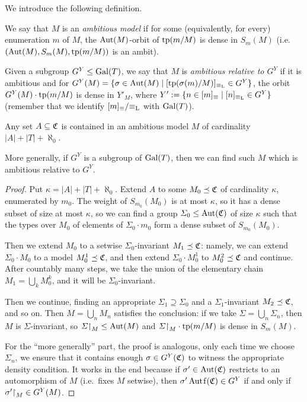 	We introduce the following definition.
	\begin{dfn}
		\label{dfn:ambitious_model}
		We say that $M$ is an \emph{ambitious model} if for some (equivalently, for every) enumeration $m$ of $M$, the $\operatorname{{Aut}}(M)$-orbit of $\operatorname{{tp}}(m/M)$ is dense in $S_m(M)$ (i.e.\ $(\operatorname{{Aut}}(M),S_m(M),\operatorname{{tp}}(m/M))$ is an ambit).
		
		Given a subgroup $G^Y\leq \operatorname{{Gal}}(T)$, we say that $M$ is \emph{ambitious relative to $G^Y$} if it is ambitious and for $G^Y(M)=\{\sigma\in \operatorname{{Aut}}(M) \mid [\operatorname{{tp}}(\sigma(m)/M)]_{\equiv_{\mathrm{L}}}\in G^Y \}$, the orbit $G^Y(M)\cdot \operatorname{{tp}}(m/M)$ is dense in $Y'_M$, where $Y':=\{n\in [m]_{\equiv}\mid [n]_{\equiv_{\mathrm{L}}}\in G^Y \}$ (remember that we identify $[m]_\equiv/{\equiv_{\mathrm{L}}}$ with $\operatorname{{Gal}}(T)$).
		\xqed{\lozenge}
	\end{dfn}
	
	\begin{prop}
		\label{prop:amb_exist}
		Any set $A\subseteq {\mathfrak C}$ is contained in an ambitious model $M$ of cardinality $\lvert A\rvert+\lvert T\rvert+\aleph_0$.
		
		More generally, if $G^Y$ is a subgroup of $\operatorname{{Gal}}(T)$, then we can find such $M$ which is ambitious relative to $G^Y$.
	\end{prop}
	\begin{proof}
		Put $\kappa=\lvert A\rvert+\lvert T\rvert+\aleph_0$. Extend $A$ to some $M_0\preceq {\mathfrak C}$ of cardinality $\kappa$, enumerated by $m_0$. The weight of $S_{m_0}(M_0)$ is at most $\kappa$, so it has a dense subset of size at most $\kappa$, so we can find a group $\Sigma_0\leq \operatorname{{Aut}}({\mathfrak C})$ of size $\kappa$ such that the types over $M_0$ of elements of $\Sigma_0\cdot m_0$ form a dense subset of $S_{m_0}(M_0)$.
		
		Then we extend $M_0$ to a setwise $\Sigma_0$-invariant $M_1\preceq {\mathfrak C}$: namely, we can extend $\Sigma_0\cdot M_0$ to a model $M_0^{1}\preceq {\mathfrak C}$, and then extend $\Sigma_0\cdot M_0^{1}$ to $M_0^2\preceq {\mathfrak C}$ and continue. After countably many steps, we take the union of the elementary chain $M_1=\bigcup_kM_0^k$, and it will be $\Sigma_0$-invariant.
		
		Then we continue, finding an appropriate $\Sigma_1 \supseteq \Sigma_0$ and a $\Sigma_1$-invariant $M_2\preceq {\mathfrak C}$, and so on. Then $M=\bigcup_n M_n$ satisfies the conclusion: if we take $\Sigma=\bigcup_n \Sigma_n$, then $M$ is $\Sigma$-invariant, so $\Sigma\mathord{\upharpoonright}_M\leq \operatorname{{Aut}}(M)$ and $\Sigma\mathord{\upharpoonright}_{M}\cdot \operatorname{{tp}}(m/M)$ is dense in $S_m(M)$.
		
		For the ``more generally'' part, the proof is analogous, only each time we choose $\Sigma_n$, we ensure that it contains enough $\sigma\in G^Y({\mathfrak C})$ to witness the appropriate density condition. It works in the end because if $\sigma'\in \operatorname{{Aut}}({\mathfrak C})$ restricts to an automorphism of $M$ (i.e.\ fixes $M$ setwise), then $\sigma'\Autf(\fC)\in G^Y$ if and only if $\sigma'\mathord{\upharpoonright}_M\in G^Y(M)$.
	\end{proof}
	
